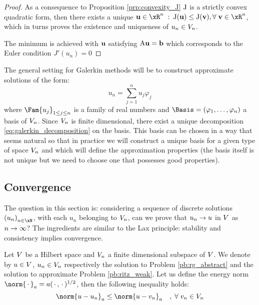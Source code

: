 \begin{proof}
As a consequence to Proposition \ref{prp:convexity_J} ${\mathrm J}$ is a strictly convex quadratic form, then there exists a unique  $\vecu \in \xR^n\;:\:\matJ(\vecu) \leq \matJ(\vecv), \forany  \vecv \in \xR^n$, which in turns proves the existence and uniqueness of $u_n \in {V}_n$.

\medskip
The minimum is achieved with $\mathbf u$ satisfying ${\mathrm A} \mathbf u = \mathbf b$ which corresponds to the Euler condition $J'(u_n) = 0$
\end{proof}

The general setting for Galerkin methods will be to construct approximate solutions of the form:
\begin{equation}\label{eq:galerkin_decomposition}
u_n = \sum_{j = 1}^{n} u_j \varphi_j
\end{equation}
where $\Fam{u_j}_{1\leq j \leq n}$ is a family of real numbers and $\Basis= (\varphi_1,\dots,\varphi_n)$ a basis of ${V}_n$.
Since ${V}_n$ is finite dimensional, there exist a unique decomposition \eqref{eq:galerkin_decomposition} on the basis. This basis can be chosen in a way that seems natural so that in practice we will construct a unique basis for a given type of space ${V}_n$ and which will define the approximation properties (the basis itself is not unique but we need to choose one that possesses good properties).

\subsection{Convergence}

The question in this section is: considering a sequence of discrete solutions $\left(u_n\right)_{n\in\xN}$, with each $u_n$ belonging to ${V}_n$, can we prove that $u_n \rightarrow u$ in ${V}$ as $n \rightarrow \infty$?
The ingredients are similar to the Lax principle: stability and consistency implies convergence.

\begin{lmm}\label{lm:energy_norm}
Let ${V}$ be a Hilbert space and ${V}_n$ a finite dimensional subspace of ${V}$.
We denote by $u \in {V}$, $u_n \in {V}_n$ respectively the solution to Problem \eqref{pb:rg_abstract} and the solution to approximate Problem \eqref{pb:ritz_weak}.
Let us define the energy norm $\norm{\xDot}_a = a(\xDot,\xDot)^{1/2}$, then the following inequality holds:
\begin{equation*}
\norm{u - u_n}_a  \leq \norm{u - v_n}_a\quad,\; \forany v_n \in \xV_n
\end{equation*}
\end{lmm}

